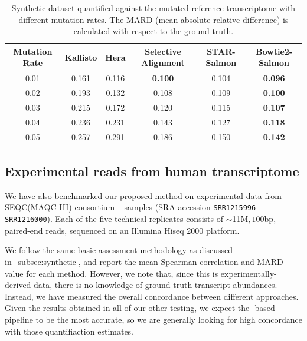 \begin{table}
\begin{center}
\begin{tabular} {c|c c c c c}
\toprule
Mutation Rate & Kallisto & Hera & Selective Alignment & STAR-Salmon &Bowtie2-Salmon \\
\midrule
  0.01 & 0.161 & 0.116 & \textbf{0.100} & 0.104 & \textbf{0.096}\\
  0.02 & 0.193 & 0.132 & 0.108 & 0.109 & \textbf{0.100}\\
  0.03 & 0.215 & 0.172 & 0.120 & 0.115 & \textbf{0.107}\\
  0.04 & 0.236 & 0.231 & 0.143 & 0.127 & \textbf{0.118}\\
  0.05 & 0.257 & 0.291 & 0.186 & 0.150 & \textbf{0.142}\\
\bottomrule
\end{tabular}
\caption[MARD of qunatification of synthetic dataset against the mutated reference transcriptome]{
  {Synthetic dataset quantified against the mutated reference transcriptome with different mutation rates. 
  The MARD (mean absolute relative difference) is calculated with respect to the ground truth.}
}
\vspace{-0.3in}
\label{tab:diff_mutation_mard}
\end{center}
\end{table}


\subsection{Experimental reads from human transcriptome}\label{res:experimental}

We have also benchmarked our proposed \sla method on experimental data from SEQC(MAQC-III) 
consortium ~\citep{seqc2014comprehensive} samples (SRA accession \texttt{SRR1215996} - \texttt{SRR1216000}). 
Each of the five technical replicates consists of $\sim$11M$, 100$bp, paired-end reads, sequenced on an 
Illumina Hiseq 2000 platform.

We follow the same basic assessment methodology as discussed in~\cref{subsec:synthetic}, and report the mean 
Spearman correlation and MARD value for each method. However, we note that, since this is experimentally-derived 
data, there is no knowledge of ground truth transcript abundances.  Instead, we have measured the overall 
concordance between different approaches. Given the results obtained in all of our other testing, we expect 
the \bt-based pipeline to be the most accurate, so we are generally looking for high concordance with those 
quantifiaction estimates.

